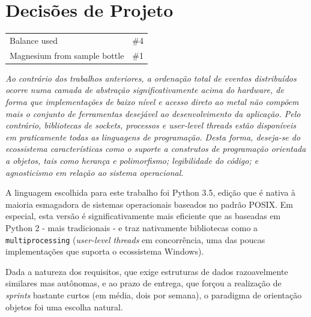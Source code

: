 \documentclass[a4paper,12pt]{article}
\begin{document}
        
        \section{Decisões de Projeto}
        
            \begin{tabular}{ll}
                Balance used & \#4\\
                Magnesium from sample bottle & \#1\\
            \end{tabular}

            \em{}Ao contrário dos trabalhos anteriores, a ordenação total de eventos distribuídos ocorre numa camada de abstração significativamente acima do hardware, de forma que implementações de baixo nível e acesso direto ao metal não compõem mais o conjunto de ferramentas desejável ao desenvolvimento da aplicação.
            Pelo contrário, bibliotecas de sockets, processos e \emph{user-level threads} estão disponíveis em praticamente todas as linguagens de programação.
            Desta forma, deseja-se do ecossistema características como o suporte a construtos de programação orientada a objetos, tais como herança e polimorfismo; legibilidade do código; e agnosticismo em relação ao sistema operacional.
            
            A linguagem escolhida para este trabalho foi Python 3.5, edição que é nativa à maioria esmagadora de sistemas operacionais baseados no padrão POSIX.
            Em especial, esta versão é significativamente mais eficiente que as baseadas em Python 2 - mais tradicionais - e traz nativamente bibliotecas como a \texttt{multiprocessing}\cite{WEBSITE:8} (\emph{user-level threads} em concorrência, uma das poucas implementações que suporta o ecossistema Windows).
            
            Dada a natureza dos requisitos, que exige estruturas de dados razoavelmente similares mas autônomas, e ao prazo de entrega, que forçou a realização de \emph{sprints} bastante curtos (em média, dois por semana), o paradigma de orientação objetos foi uma escolha natural.


        
\end{document}
